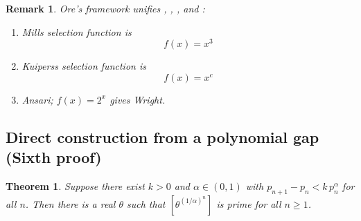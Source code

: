\documentclass[11pt,reqno]{amsart}
\theoremstyle{redplain}
\newtheorem{theorem}{Theorem}[section]
\newtheorem{remark}{Remark}[section]
\numberwithin{equation}{section}
\begin{document}
\begin{remark}
Ore's framework unifies , , %
, and :

\begin{enumerate}
\item Mills selection function is%
\begin{equation}
f(x)=x^{3}
\end{equation}

\item Kuiperss selection function is 
\begin{equation}
f(x)=x^{c}
\end{equation}

\item Ansari; $f(x)=2^{x}$ gives Wright.
\end{enumerate}
\end{remark}

\subsection{Direct construction from a polynomial gap (Sixth proof)}

\label{sec:direct}

\begin{theorem}
\label{thm:direct} Suppose there exist $k>0$ and $\alpha\in(0,1)$ with $%
p_{n+1}-p_n<k\,p_n^{\alpha}$ for all $n$. Then there is a real $\theta$ such
that $[\theta^{(1/\alpha)^n}]$ is prime for all $n\ge1$.
\end{theorem}
\end{document}
